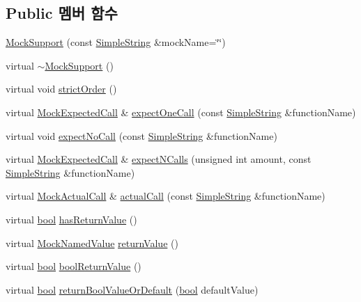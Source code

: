\subsection*{Public 멤버 함수}
\begin{DoxyCompactItemize}
\item 
\hyperlink{class_mock_support_a18c663f1f5ef64aaa5bb968c5d3a731f}{Mock\+Support} (const \hyperlink{class_simple_string}{Simple\+String} \&mock\+Name=\char`\"{}\char`\"{})
\item 
virtual \hyperlink{class_mock_support_aa8ffb4bed45f2b34bf7ceaaf0ef6ea88}{$\sim$\+Mock\+Support} ()
\item 
virtual void \hyperlink{class_mock_support_ac688a6efd05134eb2868deb504e6869f}{strict\+Order} ()
\item 
virtual \hyperlink{class_mock_expected_call}{Mock\+Expected\+Call} \& \hyperlink{class_mock_support_af01b0806319c3f8655e28e77a1152c78}{expect\+One\+Call} (const \hyperlink{class_simple_string}{Simple\+String} \&function\+Name)
\item 
virtual void \hyperlink{class_mock_support_a22667fe15401f19b7a477b06ae172271}{expect\+No\+Call} (const \hyperlink{class_simple_string}{Simple\+String} \&function\+Name)
\item 
virtual \hyperlink{class_mock_expected_call}{Mock\+Expected\+Call} \& \hyperlink{class_mock_support_a8f123d22129c483f7a1af9a59066d126}{expect\+N\+Calls} (unsigned int amount, const \hyperlink{class_simple_string}{Simple\+String} \&function\+Name)
\item 
virtual \hyperlink{class_mock_actual_call}{Mock\+Actual\+Call} \& \hyperlink{class_mock_support_a9b0ef024cdc513368395ef23d9e3af39}{actual\+Call} (const \hyperlink{class_simple_string}{Simple\+String} \&function\+Name)
\item 
virtual \hyperlink{avb__gptp_8h_af6a258d8f3ee5206d682d799316314b1}{bool} \hyperlink{class_mock_support_a2c1778bb1802da9ba4a0a134ae7f74d7}{has\+Return\+Value} ()
\item 
virtual \hyperlink{class_mock_named_value}{Mock\+Named\+Value} \hyperlink{class_mock_support_a1afc0a670963abd85b5d7f7c8af305a4}{return\+Value} ()
\item 
virtual \hyperlink{avb__gptp_8h_af6a258d8f3ee5206d682d799316314b1}{bool} \hyperlink{class_mock_support_ac456e615ecd692df5e6ee34991a1b16f}{bool\+Return\+Value} ()
\item 
virtual \hyperlink{avb__gptp_8h_af6a258d8f3ee5206d682d799316314b1}{bool} \hyperlink{class_mock_support_a5824a6db6f1d2e9df92fcb95addb93ca}{return\+Bool\+Value\+Or\+Default} (\hyperlink{avb__gptp_8h_af6a258d8f3ee5206d682d799316314b1}{bool} default\+Value)

\end{DoxyCompactItemize}
